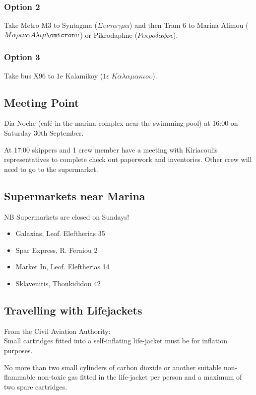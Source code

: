 \subsubsection*{Option 2}
Take Metro M3 to Syntagma ($\Sigma\upsilon\nu\tau\alpha\gamma\mu\alpha$) and then Tram 6 to Marina Alimou ($M\alpha\rho\iota\nu\alpha A\lambda\iota\mu\omicron\upsilon $) or Pikrodaphne ($P\iota\kappa\rho o \delta\alpha\phi\nu\epsilon $).
\subsubsection*{Option 3}
Take bus X96 to 1e Kalamikoy ($1\epsilon$ $K\alpha\lambda\alpha\mu\alpha\kappa\iota o \upsilon$).

\subsection*{Meeting Point}

\noindent Dia Noche (café in the marina complex near the swimming pool) at 16:00 on Saturday 30th September.

\noindent At 17:00 skippers and 1 crew member have a meeting with Kiriacoulis representatives to complete check out paperwork and inventories.  Other crew will need to go to the supermarket.

\subsection*{Supermarkets near Marina}
NB Supermarkets are closed on Sundays!
\begin{itemize}
\item Galaxias, Leof. Eleftherias 35
\item Spar Express, R. Feraiou 2
\item Market In, Leof. Eleftherias 14
\item Sklavenitis, Thoukididou 42
\end{itemize}


\subsection*{Travelling with Lifejackets}
From the Civil Aviation Authority:\\

Small cartridges fitted into a self-inflating life-jacket must be for inflation purposes.

No more than two small cylinders of carbon dioxide or another suitable non-flammable non-toxic gas fitted in the life-jacket per person and a maximum of two spare cartridges.

